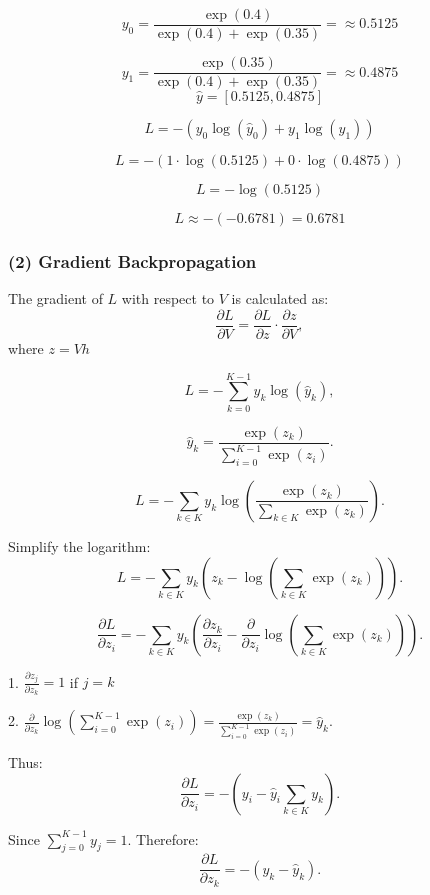 \documentclass[12pt]{ass1.cls}
\begin{document}
\[
\hat{y_0} = \frac{\exp(0.4)}{\exp(0.4) + \exp(0.35)} =  \approx 0.5125
\]

\[
\hat{y_1} =\frac{\exp(0.35)}{\exp(0.4) + \exp(0.35)} =  \approx 0.4875
\]
\[
\hat{y} = [0.5125, 0.4875]
\]

\[
L = -\left(y_0 \log(\hat{y}_0) + y_1 \log(\hat{y}_1)\right)
\]

\[
L = -\left(1 \cdot \log(0.5125) + 0 \cdot \log(0.4875)\right)
\]




\[
L = -\log(0.5125)
\]

\[
L \approx -(-0.6781) = 0.6781
\]





\newpage
\subsubsection*{(2) Gradient Backpropagation}






The gradient of \( L \) with respect to \( V \) is calculated as:
\[
\frac{\partial L}{\partial V} = \frac{\partial L}{\partial z} \cdot \frac{\partial z}{\partial V},
\]
where \( z = Vh \) 


\[
L = -\sum_{k=0}^{K-1} y_k \log(\hat{y}_k),
\]

\[
\hat{y}_k = \frac{\exp(z_k)}{\sum_{i=0}^{K-1} \exp(z_i)}.
\]

\[
L = -\sum_{k\in K} y_k \log\left(\frac{\exp(z_k)}{\sum_{k\in K }^{} \exp(z_k)}\right).
\]

Simplify the logarithm:
\[
L = -\sum_{k\in K}^{} y_k \left(z_k - \log\left(\sum_{k\in K}^{} \exp(z_k)\right)\right).
\]


\[
\frac{\partial L}{\partial z_i} = -\sum_{k\in K}^{} y_k \left(\frac{\partial z_k}{\partial z_i} - \frac{\partial}{\partial z_i} \log\left(\sum_{k\in K}^{} \exp(z_k)\right)\right).
\]

1. \(\frac{\partial z_j}{\partial z_k} = 1\) if \( j = k \)


2. \(\frac{\partial}{\partial z_k} \log\left(\sum_{i=0}^{K-1} \exp(z_i)\right) = \frac{\exp(z_k)}{\sum_{i=0}^{K-1} \exp(z_i)} = \hat{y}_k\).

\vspace{1cm}
Thus:
\[
\frac{\partial L}{\partial z_i} = -\left(y_i - \hat{y}_i \sum_{k \in K}^{} y_k\right).
\]

Since \(\sum_{j=0}^{K-1} y_j = 1\). Therefore:
\[
\frac{\partial L}{\partial z_k} = -(y_k - \hat{y}_k).
\]
\end{document}
